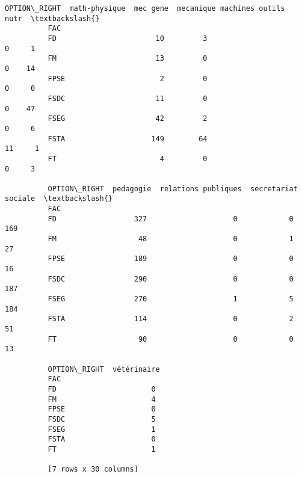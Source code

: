 \documentclass[11pt]{article}
\begin{document}
\begin{Verbatim}[commandchars=\\\{\}]
          OPTION\_RIGHT  math-physique  mec gene  mecanique machines outils  nutr  \textbackslash{}
          FAC                                                                      
          FD                       10         3                          0     1   
          FM                       13         0                          0    14   
          FPSE                      2         0                          0     0   
          FSDC                     11         0                          0    47   
          FSEG                     42         2                          0     6   
          FSTA                    149        64                         11     1   
          FT                        4         0                          0     3   
          
          OPTION\_RIGHT  pedagogie  relations publiques  secretariat  sociale  \textbackslash{}
          FAC                                                                  
          FD                  327                    0            0      169   
          FM                   48                    0            1       27   
          FPSE                189                    0            0       16   
          FSDC                290                    0            0      187   
          FSEG                270                    1            5      184   
          FSTA                114                    0            2       51   
          FT                   90                    0            0       13   
          
          OPTION\_RIGHT  vétérinaire  
          FAC                        
          FD                      0  
          FM                      4  
          FPSE                    0  
          FSDC                    5  
          FSEG                    1  
          FSTA                    0  
          FT                      1  
          
          [7 rows x 30 columns]
\end{Verbatim}
        
\end{document}
